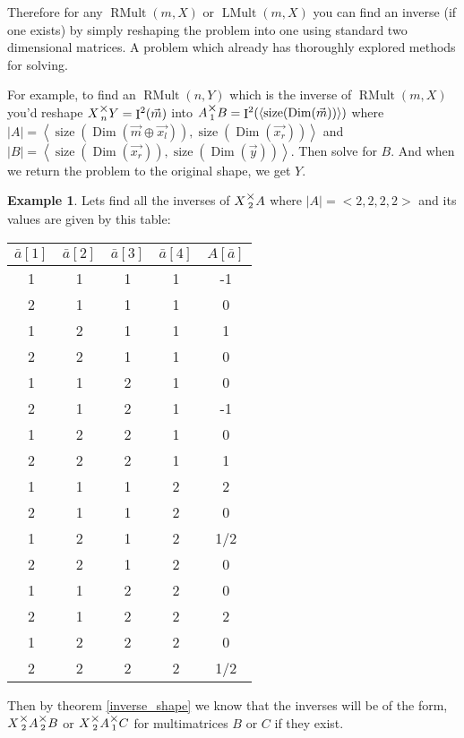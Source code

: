 \documentclass[12pt]{book}
\theoremstyle{plain}
\theoremstyle{definition}
\newtheorem{example}{Example}[chapter]
\theoremstyle{ppart}
\theoremstyle{case}
\theoremstyle{solution}
\DeclareMathOperator{\Dim}{Dim}
\DeclareMathOperator{\Ident}{I}
\DeclareMathOperator{\RMult}{RMult}
\DeclareMathOperator{\LMult}{LMult}
\DeclareMathOperator{\size}{size}
\newcommand{\mmult}[1]{\text{\raisebox{1ex}{$\underset{#1}{\times}$}}}
\newcommand{\shape}[1]{\left|#1\right|}
\begin{document}
Therefore for any $\RMult(m,X)$ or $\LMult(m,X)$ you can find an inverse (if one exists)
by simply reshaping the problem into one using standard two dimensional matrices.
A problem which already has thoroughly explored methods for solving.

For example, to find an $\RMult(n,Y)$ which is the inverse of $\RMult(m,X)$
you'd reshape $X \mmult{n} Y = \Ident^2(\vec{m})$ into $A \mmult{1} B = \Ident^2(\left<\size(\Dim(\vec{m}))\right>)$
where $\shape{A} = \left<\size(\Dim(\vec{m} \oplus \vec{x_l})), \size(\Dim(\vec{x_r}))\right>$
and   $\shape{B} = \left<\size(\Dim(\vec{x_r})),  \size(\Dim(\vec{y}))\right>$.
Then solve for $B$. And when we return the problem to the original shape, we get $Y$.

\begin{example}
Lets find all the inverses of $X \mmult{2} A$ where $\shape{A} = <2,2,2,2>$ and
its values are given by this table:
\begin{table}[h!]
\begin{center}
\begin{tabular}{c c c c | c}
$\bar{a}[1]$ & $\bar{a}[2]$ & $\bar{a}[3]$ & $\bar{a}[4]$ & $A[\bar{a}]$ \\
\hline
1           & 1           & 1           & 1           & -1 \\
2           & 1           & 1           & 1           & 0 \\
1           & 2           & 1           & 1           & 1 \\
2           & 2           & 1           & 1           & 0 \\

1           & 1           & 2           & 1           & 0 \\
2           & 1           & 2           & 1           & -1 \\
1           & 2           & 2           & 1           & 0 \\
2           & 2           & 2           & 1           & 1 \\

1           & 1           & 1           & 2           & 2 \\
2           & 1           & 1           & 2           & 0 \\
1           & 2           & 1           & 2           & 1/2 \\
2           & 2           & 1           & 2           & 0 \\

1           & 1           & 2           & 2           & 0 \\
2           & 1           & 2           & 2           & 2 \\
1           & 2           & 2           & 2           & 0 \\
2           & 2           & 2           & 2           & 1/2
\end{tabular}
\end{center}
\end{table}
Then by theorem \ref{inverse_shape} we know that the inverses will be of the form,
$X \mmult{2} A \mmult{2} B$ or $X \mmult{2} A \mmult{1} C$ for multimatrices
$B$ or $C$ if they exist.


\end{example}
\end{document}
